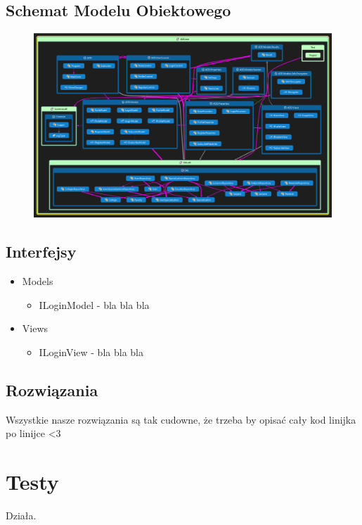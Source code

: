 \documentclass[12pt,a4paper]{article}
\begin{document}
		\subsection{Schemat Modelu Obiektowego}
			\begin{figure}[H]
			\centering
			\includegraphics[width=1.0\textwidth]{class_diagram}
			\end{figure}
		\subsection{Interfejsy}
			\begin{itemize}
				\item Models
				\begin{itemize}
					\item ILoginModel - bla bla bla
				\end{itemize}
				\item Views
				\begin{itemize}
					\item ILoginView - bla bla bla
				\end{itemize}
			\end{itemize}
		\subsection{Rozwiązania}
			Wszystkie nasze rozwiązania są tak cudowne, że trzeba by opisać cały kod linijka po linijce <3
	\section{Testy}
		Działa. 
\end{document}
